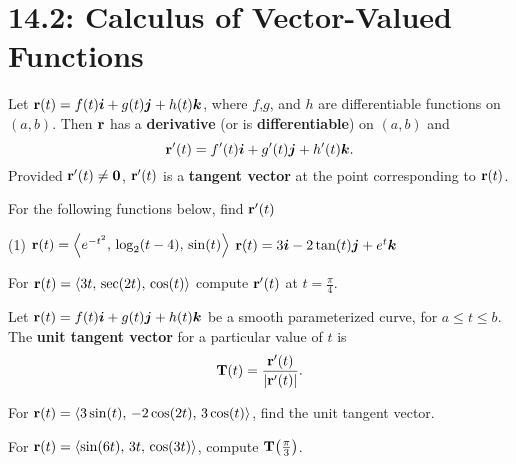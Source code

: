 \documentclass[../mathNotesPreamble]{subfiles}
\begin{document}
\section{14.2: Calculus of Vector-Valued Functions}
  \begin{defn*}
    Let ${\mathbf{r}}(t)=f(t){\bm{i}}+g(t){\bm{j}}+h(t){\bm{k}}$, where $f$,$g$, and $h$ are differentiable functions on $(a,b)$. Then ${\mathbf{r}}$ has a \textbf{derivative} (or is \textbf{differentiable}) on $(a,b)$ and
      \[{\mathbf{r}}'(t)=f'(t){\bm{i}}+g'(t){\bm{j}}+h'(t){\bm{k}}.\]
    Provided ${\mathbf{r}}'(t)\neq \mathbf{0}$, ${\mathbf{r}}'(t)$ is a \textbf{tangent vector} at the point corresponding to ${\mathbf{r}}(t)$.
  \end{defn*}
  \begin{ex*}
    For the following functions below, find ${\mathbf{r}}'(t)$
  \end{ex*}
  \begin{tasks}[after-item-skip=\stretch{1}](1)
    \task ${\mathbf{r}}(t)={\left\langle e^{-t^2},\,\log_2(t-4),\,\sin(t) \right\rangle}$
    \task ${\mathbf{r}}(t)=3{\bm{i}}-2\tan(t){\bm{j}}+e^t{\bm{k}}$
  \end{tasks}
  \begin{ex*}
    For ${\mathbf{r}}(t)={\left\langle 3t,\,\sec(2t),\,\cos(t) \right\rangle}$ compute ${\mathbf{r}}'(t)$ at $t=\frac{\pi}{4}$.
  \end{ex*}
  \pagebreak
  
  \begin{defn*}
    Let ${\mathbf{r}}(t)=f(t){\bm{i}}+g(t){\bm{j}}+h(t){\bm{k}}$ be a smooth parameterized curve, for $a\leq t\leq b$. The \textbf{unit tangent vector} for a particular value of $t$ is
      \[\mathbf T(t)=\frac{{\mathbf{r}}'(t)}{{\left\vert{\mathbf{r}}'(t)\right\vert}}.\]
  \end{defn*}
  \begin{ex*}
    For ${\mathbf{r}}(t)={\left\langle 3\sin(t),\,-2\cos(2t),\,3\cos(t) \right\rangle}$, find the unit tangent vector.
  \end{ex*}
  \begin{ex*}
    For ${\mathbf{r}}(t)={\left\langle \sin(6t),\,3t,\,\cos(3t) \right\rangle}$, compute $\mathbf T{\left(\frac{\pi}{3}\right)}$.
  \end{ex*}
  \pagebreak
\end{document}
